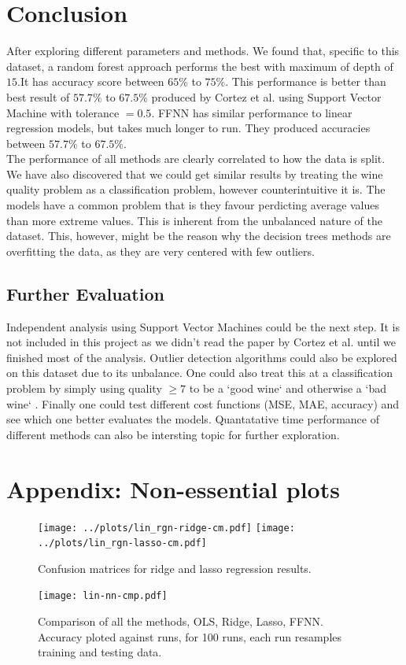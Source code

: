 \documentclass[english,notitlepage,reprint,nofootinbib]{revtex4-1}
\begin{document}
\section{Conclusion}\label{sec:conclusion}
After exploring different parameters and methods. We found that, specific to this dataset, a random forest approach performs the best with maximum of depth of $ 15 $.It has accuracy score between $ 65\% $ to $ 75\% $. This performance is better than best result of $ 57.7\% $ to $ 67.5\% $ produced by Cortez et al. using Support Vector Machine with tolerance $ =0.5 $. \cite{CORTEZ2009547} FFNN has similar performance to linear regression models, but takes much longer to run. They produced accuracies between $57.7\%$ to $67.5\%$. \\
The performance of all methods are clearly correlated to how the data is split. We have also discovered that we could get similar results by treating the wine quality problem as a classification problem, however counterintuitive it is. The models have a common problem that is they favour perdicting average values than more extreme values. This is inherent from the unbalanced nature of the dataset. This, however, might be the reason why the decision trees methods are overfitting the data, as they are very centered with few outliers.


\subsection{Further Evaluation}\label{sec:evaluation}
Independent analysis using Support Vector Machines could be the next step. It is not included in this project as we didn't read the paper by Cortez et al. \cite{CORTEZ2009547} until we finished most of the analysis. Outlier detection algorithms could also be explored on this dataset due to its unbalance. One could also treat this at a classification problem by simply using quality $ \ge 7 $ to be a `good wine` and otherwise a `bad wine` \cite{learning_2017}. Finally one could test different cost functions (MSE, MAE, accuracy) and see which one better evaluates the models. Quantatative time performance of different methods can also be intersting topic for further exploration.

\section{Appendix: Non-essential plots}
\begin{figure}[ht]
	\centering
	\texttt{[image: ../plots/lin\_rgn-ridge-cm.pdf]}
	\texttt{[image: ../plots/lin\_rgn-lasso-cm.pdf]}
	\caption{Confusion matrices for ridge and lasso regression results.}
	\label{fig:ridge-lasso-cm}
\end{figure}

\begin{figure}[ht]
	\centering
	\texttt{[image: lin-nn-cmp.pdf]}
	\caption{Comparison of all the methods, OLS, Ridge, Lasso, FFNN. Accuracy ploted against runs, for 100 runs, each run resamples training and testing data.}
	\label{fig:lin-nn-compared}
\end{figure}

\onecolumngrid

%

\end{document}
